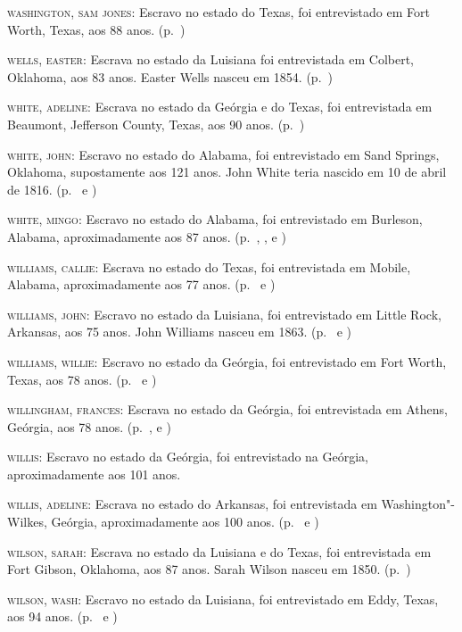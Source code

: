 \begin{Parskip}
\textsc{washington, sam jones:} Escravo no estado do Texas, foi
entrevistado em Fort Worth, Texas, aos 88 anos. (p.~\pageref{ref280})

\textsc{wells, easter:} Escrava no estado da Luisiana foi entrevistada
em Colbert, Oklahoma, aos 83 anos. Easter Wells nasceu em 1854. (p.~\pageref{ref281})

\textsc{white, adeline:} Escrava no estado da Geórgia e do Texas, foi
entrevistada em Beaumont, Jefferson County, Texas, aos 90 anos. (p.~\pageref{ref282})

\textsc{white, john:} Escravo no estado do Alabama, foi entrevistado em
Sand Springs, Oklahoma, supostamente aos 121 anos. John White teria
nascido em 10 de abril de 1816. (p.~\pageref{ref283} e \pageref{ref284})

\textsc{white, mingo:} Escravo no estado do Alabama, foi entrevistado em
Burleson, Alabama, aproximadamente aos 87 anos. (p.~\pageref{ref285}, \pageref{ref286}, \pageref{ref287} e \pageref{ref288})

\textsc{williams, callie:} Escrava no estado do Texas, foi entrevistada
em Mobile, Alabama, aproximadamente aos 77 anos. (p.~\pageref{ref289} e \pageref{ref290})

\textsc{williams, john:} Escravo no estado da Luisiana, foi entrevistado
em Little Rock, Arkansas, aos 75 anos. John Williams nasceu em 1863. (p.~\pageref{ref291} e \pageref{ref292})

\textsc{williams, willie:} Escravo no estado da Geórgia, foi
entrevistado em Fort Worth, Texas, aos 78 anos. (p.~\pageref{ref293} e \pageref{ref294})

\textsc{willingham, frances:} Escrava no estado da Geórgia, foi
entrevistada em Athens, Geórgia, aos 78 anos. (p.~\pageref{ref295}, \pageref{ref296} e \pageref{ref297})

\textsc{willis:} Escravo no estado da Geórgia, foi entrevistado na
Geórgia, aproximadamente aos 101 anos. %

\textsc{willis, adeline:} Escrava no estado do Arkansas, foi
entrevistada em Washington"-Wilkes, Geórgia, aproximadamente aos 100
anos. (p.~\pageref{ref298} e \pageref{ref299})

\textsc{wilson, sarah:} Escrava no estado da Luisiana e do Texas, foi
entrevistada em Fort Gibson, Oklahoma, aos 87 anos. Sarah Wilson nasceu
em 1850. (p.~\pageref{ref300})

\textsc{wilson, wash:} Escravo no estado da Luisiana, foi entrevistado em
Eddy, Texas, aos 94 anos. (p.~\pageref{ref301} e \pageref{ref302})


\end{Parskip}
